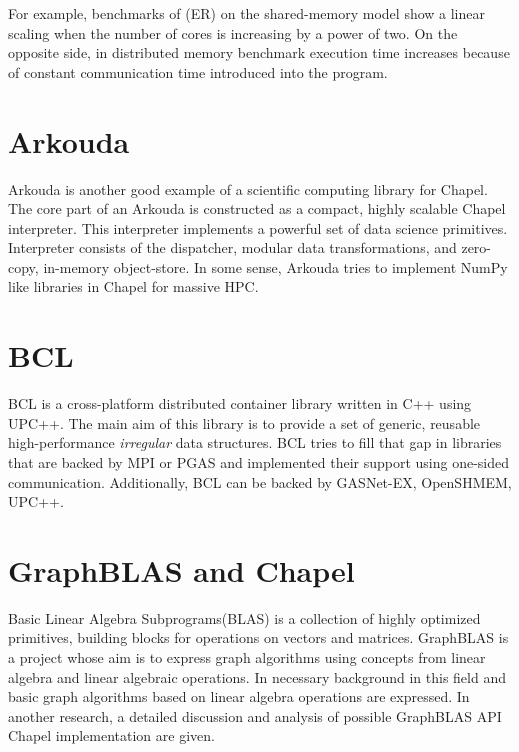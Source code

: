 \documentclass[14pt]{extreport}
\begin{document}
For example, benchmarks of (ER) on the shared-memory model show a linear scaling when the number of cores is increasing by a power of two. On the opposite side, in distributed memory benchmark execution time increases because of constant communication time introduced into the program.

\section{Arkouda}
Arkouda\cite{arkouda} is another good example of a scientific computing library for Chapel. The core part of an Arkouda is constructed as a compact, highly scalable Chapel interpreter. This interpreter implements a powerful set of data science primitives. Interpreter consists of the dispatcher, modular data transformations, and zero-copy, in-memory object-store. In some sense, Arkouda tries to implement NumPy like libraries in Chapel for massive HPC.

\section{BCL}
BCL\cite{bcl} is a cross-platform distributed container library written in C++ using UPC++. The main aim of this library is to provide a set of generic, reusable high-performance \textit{irregular} data structures. BCL tries to fill that gap in libraries that are backed by MPI or PGAS and implemented their support using one-sided communication. Additionally, BCL can be backed by GASNet-EX, OpenSHMEM, UPC++. 

\section{GraphBLAS and Chapel}
Basic Linear Algebra Subprograms(BLAS)\cite{blas} is a collection of highly optimized primitives, building blocks for operations on vectors and matrices. GraphBLAS\cite{graphblasmath} is a project whose aim is to express graph algorithms using concepts from linear algebra and linear algebraic operations. In \cite{graphlinalg} necessary background in this field and basic graph algorithms based on linear algebra operations are expressed. In another research, \cite{azadb17a} a detailed discussion and analysis of possible GraphBLAS API Chapel implementation are given.

\printbibliography
\end{document}
